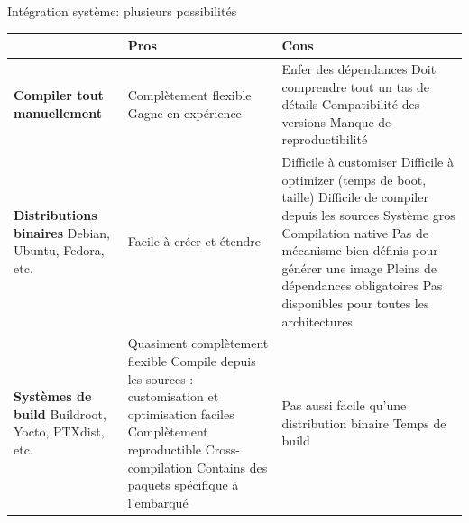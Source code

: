 \begin{frame}{Intégration système: plusieurs possibilités}
  \tiny
  \begin{tabularx}{14cm}{|X|X|X|}
    \hline
    & {\bf Pros} & {\bf Cons} \\
    \hline
    {\bf Compiler tout manuellement} &
    Complètement flexible \newline
    Gagne en expérience &
    Enfer des dépendances \newline
    Doit comprendre tout un tas de détails \newline
    Compatibilité des versions \newline
    Manque de reproductibilité \\
    \hline
    {\bf Distributions binaires} \newline Debian, Ubuntu, Fedora, etc.
    &
    Facile à créer et étendre
    &
    Difficile à customiser \newline
    Difficile à optimizer (temps de boot, taille) \newline
    Difficile de compiler depuis les sources \newline
    Système gros \newline
    Compilation native \newline
    Pas de mécanisme bien définis pour générer une image \newline
    Pleins de dépendances obligatoires \newline
    Pas disponibles pour toutes les architectures \\
    \hline
    {\bf Systèmes de build} \newline Buildroot, Yocto, PTXdist, etc.
    &
    Quasiment complètement flexible \newline
    Compile depuis les sources : customisation et optimisation faciles \newline
    Complètement reproductible \newline
    Cross-compilation \newline
    Contains des paquets spécifique à l'embarqué \newline
    &
    Pas aussi facile qu'une distribution binaire \newline
    Temps de build \\
    \hline
  \end{tabularx}
\end{frame}

